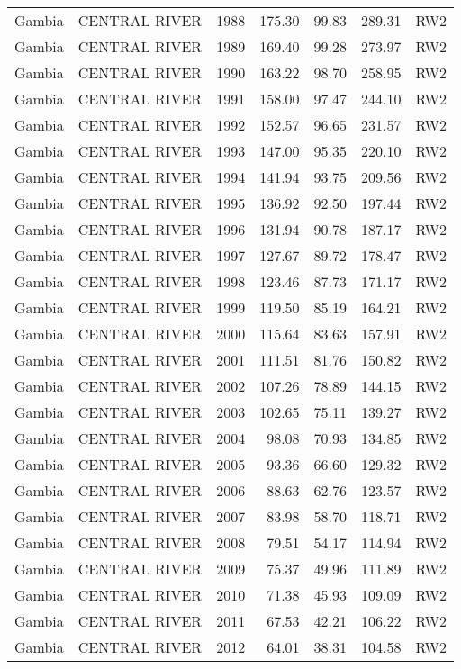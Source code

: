 \begin{longtable}{lllrrrl}
  Gambia & CENTRAL RIVER & 1988 & 175.30 & 99.83 & 289.31 & RW2 \\ 
  Gambia & CENTRAL RIVER & 1989 & 169.40 & 99.28 & 273.97 & RW2 \\ 
  Gambia & CENTRAL RIVER & 1990 & 163.22 & 98.70 & 258.95 & RW2 \\ 
  Gambia & CENTRAL RIVER & 1991 & 158.00 & 97.47 & 244.10 & RW2 \\ 
  Gambia & CENTRAL RIVER & 1992 & 152.57 & 96.65 & 231.57 & RW2 \\ 
  Gambia & CENTRAL RIVER & 1993 & 147.00 & 95.35 & 220.10 & RW2 \\ 
  Gambia & CENTRAL RIVER & 1994 & 141.94 & 93.75 & 209.56 & RW2 \\ 
  Gambia & CENTRAL RIVER & 1995 & 136.92 & 92.50 & 197.44 & RW2 \\ 
  Gambia & CENTRAL RIVER & 1996 & 131.94 & 90.78 & 187.17 & RW2 \\ 
  Gambia & CENTRAL RIVER & 1997 & 127.67 & 89.72 & 178.47 & RW2 \\ 
  Gambia & CENTRAL RIVER & 1998 & 123.46 & 87.73 & 171.17 & RW2 \\ 
  Gambia & CENTRAL RIVER & 1999 & 119.50 & 85.19 & 164.21 & RW2 \\ 
  Gambia & CENTRAL RIVER & 2000 & 115.64 & 83.63 & 157.91 & RW2 \\ 
  Gambia & CENTRAL RIVER & 2001 & 111.51 & 81.76 & 150.82 & RW2 \\ 
  Gambia & CENTRAL RIVER & 2002 & 107.26 & 78.89 & 144.15 & RW2 \\ 
  Gambia & CENTRAL RIVER & 2003 & 102.65 & 75.11 & 139.27 & RW2 \\ 
  Gambia & CENTRAL RIVER & 2004 & 98.08 & 70.93 & 134.85 & RW2 \\ 
  Gambia & CENTRAL RIVER & 2005 & 93.36 & 66.60 & 129.32 & RW2 \\ 
  Gambia & CENTRAL RIVER & 2006 & 88.63 & 62.76 & 123.57 & RW2 \\ 
  Gambia & CENTRAL RIVER & 2007 & 83.98 & 58.70 & 118.71 & RW2 \\ 
  Gambia & CENTRAL RIVER & 2008 & 79.51 & 54.17 & 114.94 & RW2 \\ 
  Gambia & CENTRAL RIVER & 2009 & 75.37 & 49.96 & 111.89 & RW2 \\ 
  Gambia & CENTRAL RIVER & 2010 & 71.38 & 45.93 & 109.09 & RW2 \\ 
  Gambia & CENTRAL RIVER & 2011 & 67.53 & 42.21 & 106.22 & RW2 \\ 
  Gambia & CENTRAL RIVER & 2012 & 64.01 & 38.31 & 104.58 & RW2 \\ 

\end{longtable}
